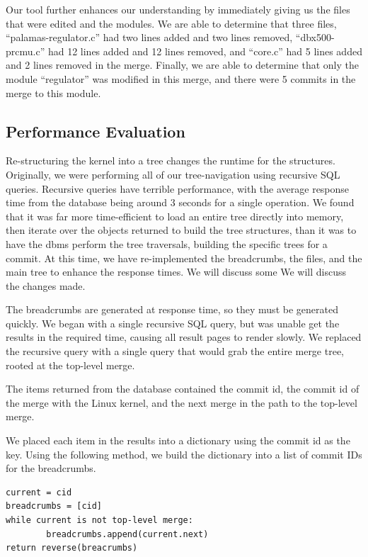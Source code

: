 \documentclass[conference, draftclsnofoot]{IEEEtran}
\begin{document}
Our tool further enhances our understanding by immediately giving us the files
that were edited and the modules. We are able to determine that three files,
``palamas-regulator.c'' had two lines added and two lines removed,
``dbx500-prcmu.c'' had 12 lines added and 12 lines removed, and ``core.c'' had
5 lines added and 2 lines removed in the merge. Finally, we are able to
determine that only the module ``regulator'' was modified in this merge, and
there were 5 commits in the merge to this module.


\subsection{Performance Evaluation}

Re-structuring the kernel into a tree changes the runtime for the structures.
Originally, we were performing all of our tree-navigation using recursive SQL
queries. Recursive queries have terrible performance, with the average response
time from the database being around 3 seconds for a single operation. We found
that it was far more time-efficient to load an entire tree directly into
memory, then iterate over the objects returned to build the tree structures,
than it was to have the dbms perform the tree traversals, building the specific
trees for a commit. At this time, we have re-implemented the breadcrumbs, the
files, and the main tree to enhance the response times. We will discuss some We
will discuss the changes made.

The breadcrumbs are generated at response
time, so they must be generated quickly. We began with a single recursive SQL
query, but was unable get the results in the required time, causing all result
pages to render slowly. We replaced the recursive query with a single query
that would grab the entire merge tree, rooted at the top-level merge.

The items returned from the database contained the commit id, the commit id of
the merge with the Linux kernel, and the next merge in the path to the
top-level merge.

We placed each item in the results into a dictionary using the commit id as the
key. Using the following method, we build the dictionary into a list of commit
IDs for the breadcrumbs.

\begin{verbatim}
current = cid
breadcrumbs = [cid]
while current is not top-level merge:
        breadcrumbs.append(current.next)
return reverse(breacrumbs)
\end{verbatim}
\end{document}
